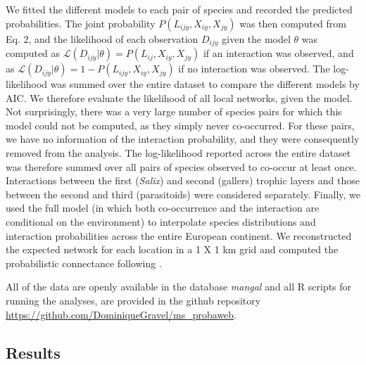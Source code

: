 \documentclass[12pt]{article}
\begin{document}
We fitted the different models to each pair of species and recorded the
predicted probabilities. The joint probability $P(L_{ijy},X_{iy},X_{jy})$ was
then computed from Eq. 2, and the likelihood of each observation $D_{ijy}$ given the model $\theta$ was computed
as $\mathcal{L}(D_{ijy}\lvert \theta)=P(L_{ij},X_{iy},X_{jy})$ if an
interaction was observed, and as $\mathcal{L}(D_{ijy}\lvert \theta) =
1-P(L_{ijy}, X_{iy}, X_{jy})$ if no interaction was observed. The log-likelihood was summed over the entire dataset to compare the different models
by AIC. We therefore evaluate the likelihood of all local networks, given the
model. Not surprisingly, there was a very large number of species pairs for
which this model could not be computed, as they simply never co-occurred. For
these pairs, we have no information of the interaction probability, and they
were consequently removed from the analysis. The log-likelihood reported
across the entire dataset was therefore summed over all pairs of species observed to co-occur at least once. Interactions between the first (\textit{Salix}) and
second (gallers) trophic layers and those between the second and third
(parasitoids) were considered separately. Finally, we used the full model (in
which both co-occurrence and the interaction are conditional on the
environment) to interpolate species distributions and interaction
probabilities across the entire European continent. We reconstructed the
expected network for each location in a 1 X 1 km grid and computed the
probabilistic connectance following \citet{Poisot2015c}.

All of the data are openly available in the database \emph{mangal}
\citep{Poisot2015b} and all R scripts for running the analyses, are provided
in the github repository
\url{https://github.com/DominiqueGravel/ms_probaweb}.

\subsection*{Results}
\end{document}
